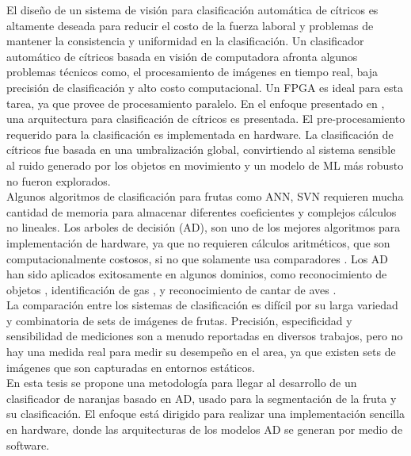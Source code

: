 \documentclass[twoside,spanish,ESP,MSc]{plantillaLabUPV}
\theoremstyle{definition}
\begin{document}



El diseño de un sistema de visión para clasificación automática de cítricos es altamente deseada para reducir el costo de la fuerza laboral y problemas de mantener la consistencia y uniformidad en la clasificación. Un clasificador automático de cítricos basada en visión de computadora afronta algunos problemas técnicos como, el procesamiento de imágenes en tiempo real, baja precisión de clasificación y alto costo computacional. Un FPGA es ideal para esta tarea, ya que provee de procesamiento paralelo.  En el enfoque presentado en \cite{6820292}, una arquitectura para clasificación de cítricos es presentada. El pre-procesamiento requerido para la clasificación es implementada en hardware. La clasificación de cítricos fue basada en una umbralización global, convirtiendo al sistema sensible al ruido generado por los objetos en movimiento y un modelo de ML más robusto no fueron explorados.\\



Algunos algoritmos de clasificación para frutas como ANN, SVN requieren mucha cantidad de memoria para almacenar diferentes coeficientes y complejos cálculos no lineales. Los arboles de decisión (AD), son uno de los mejores algoritmos para implementación de hardware, ya que no requieren cálculos aritméticos, que son computacionalmente costosos, si no que solamente usa comparadores \cite{6636881}. Los AD han sido aplicados exitosamente en algunos dominios, como reconocimiento de objetos \cite{10.1007/978-3-540-32256-6_52}, identificación de gas \cite{li}, y reconocimiento de cantar de aves \cite{5986215}.\\



La comparación entre los sistemas de clasificación es difícil por su larga variedad y combinatoria de sets de imágenes de frutas. Precisión, especificidad y sensibilidad de mediciones son a menudo reportadas en diversos trabajos, pero no hay una medida real para medir su desempeño en el area, ya que existen sets de imágenes que son capturadas en entornos estáticos.\\

En esta tesis se propone una metodología para llegar al desarrollo de un clasificador de naranjas basado en AD, usado para la segmentación de la fruta y su clasificación. El enfoque está dirigido para realizar una implementación sencilla en hardware, donde las arquitecturas de los modelos AD se generan por medio de software.
\end{document}
